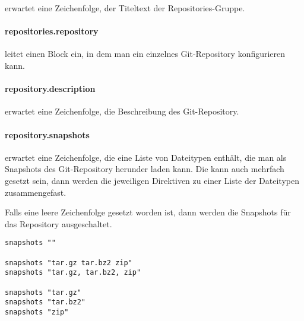  erwartet eine Zeichenfolge, der Titeltext der
Repositories-Gruppe.

\paragraph{repositories.repository}

 leitet einen Block ein, in dem man ein einzelnes
Git-Repository konfigurieren kann.

\paragraph{repository.description}

 erwartet eine Zeichenfolge, die Beschreibung des
Git-Repository.

\paragraph{repository.snapshots}

 erwartet eine Zeichenfolge, die eine Liste von Dateitypen
enthält, die man als Snapshots des Git-Repository herunder laden kann. Die
 kann auch mehrfach gesetzt sein, dann werden die
jeweiligen Direktiven zu einer Liste der Dateitypen zusammengefast.

Falls eine leere Zeichenfolge gesetzt worden ist, dann werden die Snapshots für
das Repository ausgeschaltet.

\begin{lstlisting}[style=Java, caption=Beispiele für die \directive{snapshots}]
snapshots ""

snapshots "tar.gz tar.bz2 zip"
snapshots "tar.gz, tar.bz2, zip"

snapshots "tar.gz"
snapshots "tar.bz2"
snapshots "zip"
\end{lstlisting}
